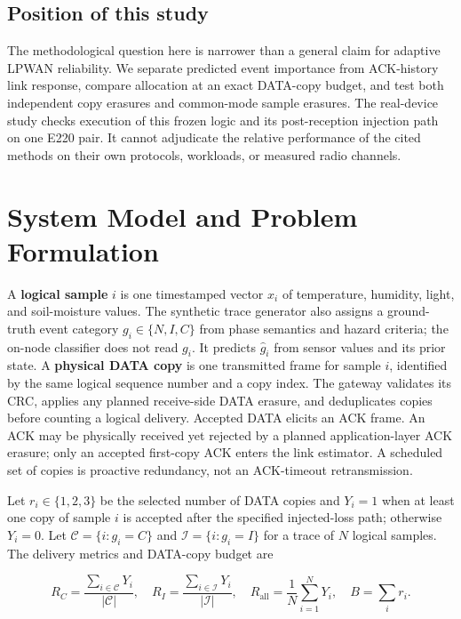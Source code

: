 \documentclass[11pt]{article}
\begin{document}
\subsection{Position of this study}\label{sec:position-of-this-study}

The methodological question here is narrower than a general claim for adaptive LPWAN reliability. We separate predicted event importance from ACK-history link response, compare allocation at an exact DATA-copy budget, and test both independent copy erasures and common-mode sample erasures. The real-device study checks execution of this frozen logic and its post-reception injection path on one E220 pair. It cannot adjudicate the relative performance of the cited methods on their own protocols, workloads, or measured radio channels.

\section{System Model and Problem Formulation}\label{sec:system-model}

A \textbf{logical sample} \(i\) is one timestamped vector \(x_i\) of temperature, humidity, light, and soil-moisture values. The synthetic trace generator also assigns a ground-truth event category \(g_i\in\{N,I,C\}\) from phase semantics and hazard criteria; the on-node classifier does not read \(g_i\). It predicts \(\hat g_i\) from sensor values and its prior state. A \textbf{physical DATA copy} is one transmitted frame for sample \(i\), identified by the same logical sequence number and a copy index. The gateway validates its CRC, applies any planned receive-side DATA erasure, and deduplicates copies before counting a logical delivery. Accepted DATA elicits an ACK frame. An ACK may be physically received yet rejected by a planned application-layer ACK erasure; only an accepted first-copy ACK enters the link estimator. A scheduled set of copies is proactive redundancy, not an ACK-timeout retransmission.

Let \(r_i\in\{1,2,3\}\) be the selected number of DATA copies and \(Y_i=1\) when at least one copy of sample \(i\) is accepted after the specified injected-loss path; otherwise \(Y_i=0\). Let \(\mathcal C=\{i:g_i=C\}\) and \(\mathcal I=\{i:g_i=I\}\) for a trace of \(N\) logical samples. The delivery metrics and DATA-copy budget are

\begin{equation}\label{eq:critical-delivery}
R_C=\frac{\sum_{i\in \mathcal C}Y_i}{|\mathcal C|},\quad R_I=\frac{\sum_{i\in \mathcal I}Y_i}{|\mathcal I|},\quad R_{\mathrm{all}}=\frac{1}{N}\sum_{i=1}^{N}Y_i,\quad B=\sum_i r_i.
\end{equation}
\end{document}
